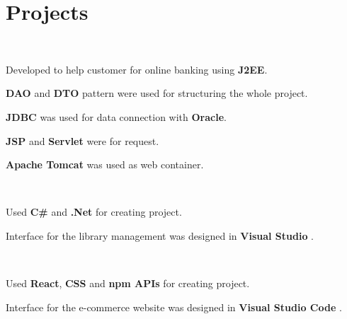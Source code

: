 \documentclass[]{deedy-resume-openfont}
\begin{document}
\hfill
\begin{minipage}[t]{0.66\textwidth} 





\section{Projects}

\\
\sectionsep
\begin{tightemize}
\item Developed to help customer for online banking using \textbf{J2EE}.
\item \textbf{DAO} and \textbf{DTO} pattern were used for structuring the whole project.
\item \textbf{JDBC} was used for data connection with  \textbf{Oracle}.
\item \textbf{JSP} and \textbf{Servlet} were for request.
\item \textbf{Apache Tomcat} was used as web container.
\end{tightemize}
\sectionsep

\\
\begin{tightemize}
\item Used \textbf{C\#} and \textbf{.Net} for creating project.
\item Interface for the library management was designed in \textbf{Visual Studio }. 
\end{tightemize}
\sectionsep

\\
\begin{tightemize}
\item Used \textbf{React}, \textbf{CSS} and \textbf{npm APIs} for creating project.
\item Interface for the e-commerce website was designed in \textbf{Visual Studio Code }. 
\end{tightemize}
\sectionsep



\end{minipage}
\end{document}
